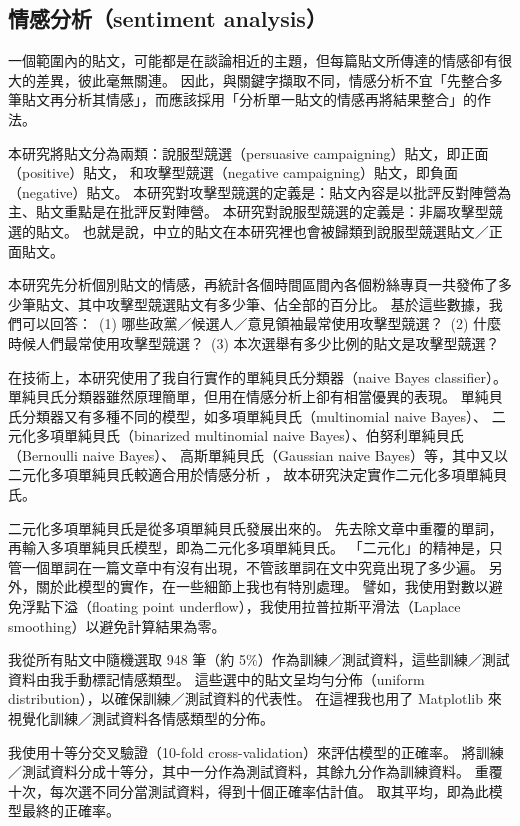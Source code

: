 \documentclass[letterpaper, 10pt, conference]{ieeeconf}   %
\begin{document}
\begin{CJK}{UTF8}{bsmi}
\subsection*{情感分析（sentiment analysis）}

一個範圍內的貼文，可能都是在談論相近的主題，但每篇貼文所傳達的情感卻有很大的差異，彼此毫無關連。%
因此，與關鍵字擷取不同，情感分析不宜「先整合多筆貼文再分析其情感」，而應該採用「分析單一貼文的情感再將結果整合」的作法。%

本研究將貼文分為兩類：說服型競選（persuasive campaigning）貼文，即正面（positive）貼文，%
和攻擊型競選（negative campaigning）貼文，即負面（negative）貼文。%
本研究對攻擊型競選的定義是：貼文內容是以批評反對陣營為主、貼文重點是在批評反對陣營。%
本研究對說服型競選的定義是：非屬攻擊型競選的貼文。%
也就是說，中立的貼文在本研究裡也會被歸類到說服型競選貼文／正面貼文。%

本研究先分析個別貼文的情感，再統計各個時間區間內各個粉絲專頁一共發佈了多少筆貼文、其中攻擊型競選貼文有多少筆、佔全部的百分比。%
基於這些數據，我們可以回答：%
\,(1) 哪些政黨／候選人／意見領袖最常使用攻擊型競選？%
\,(2) 什麼時候人們最常使用攻擊型競選？%
\,(3) 本次選舉有多少比例的貼文是攻擊型競選？%

在技術上，本研究使用了我自行實作的單純貝氏分類器（naive Bayes classifier）\cite{c13}。%
單純貝氏分類器雖然原理簡單，但用在情感分析上卻有相當優異的表現。%
單純貝氏分類器又有多種不同的模型，如多項單純貝氏（multinomial naive Bayes）、%
二元化多項單純貝氏（binarized multinomial naive Bayes）、伯努利單純貝氏（Bernoulli naive Bayes）、%
高斯單純貝氏（Gaussian naive Bayes）等，其中又以二元化多項單純貝氏較適合用於情感分析 \cite{c14}，%
故本研究決定實作二元化多項單純貝氏。%

二元化多項單純貝氏是從多項單純貝氏發展出來的。%
先去除文章中重覆的單詞，再輸入多項單純貝氏模型，即為二元化多項單純貝氏。%
「二元化」的精神是，只管一個單詞在一篇文章中有沒有出現，不管該單詞在文中究竟出現了多少遍。%
另外，關於此模型的實作，在一些細節上我也有特別處理。%
譬如，我使用對數以避免浮點下溢（floating point underflow），我使用拉普拉斯平滑法（Laplace smoothing）以避免計算結果為零。%

我從所有貼文中隨機選取 948 筆（約 5\%）作為訓練／測試資料，這些訓練／測試資料由我手動標記情感類型。%
這些選中的貼文呈均勻分佈（uniform distribution），以確保訓練／測試資料的代表性。%
在這裡我也用了 Matplotlib 來視覺化訓練／測試資料各情感類型的分佈。%

我使用十等分交叉驗證（10-fold cross-validation）來評估模型的正確率。%
將訓練／測試資料分成十等分，其中一分作為測試資料，其餘九分作為訓練資料。%
重覆十次，每次選不同分當測試資料，得到十個正確率估計值。%
取其平均，即為此模型最終的正確率。%


\end{CJK}
\end{document}
